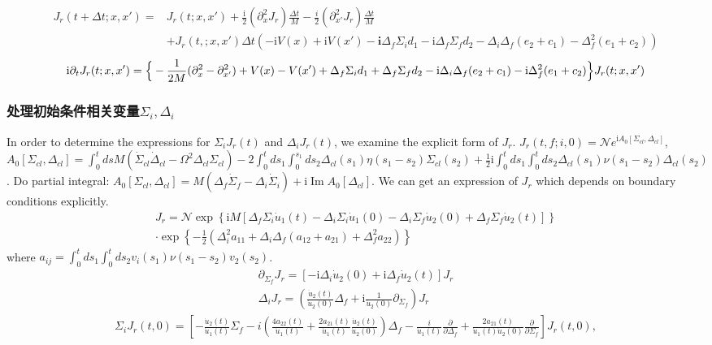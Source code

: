 \documentclass{article}
\renewcommand{\exp}[1]{\operatorname{exp}\left\{#1\right\}}
\begin{document}
    \begin{align*}
        J_r(t+\Delta t;x,x')=&J_r(t;x,x')+\frac{\mathrm{i}}{2}(\partial_x^2J_r)\frac{\Delta t}{M}-\frac{i}{2}(\partial_{x'}^2J_r)\frac{\Delta t}{M}\\
        &+J_r(t,;x,x')\Delta t\left(-\mathrm{i}V(x)+\mathrm{i}V(x')-\mathbf{i}\Delta_f\Sigma_id_1-\mathrm{i}\Delta_f\Sigma_f d_2-\Delta_i\Delta_f(e_2+c_1)-\Delta_f^2(e_1+c_2)\right)
    \end{align*}
    \begin{align}
        \mathrm{i}\partial_t J_r(t;x,x')=\Big{\{ }-\frac{1}{2M}(\partial_x^2-\partial_{x'}^2)+V(x)-V(x')+\Delta_f\Sigma_i d_1+\Delta_f\Sigma_fd_2-\mathrm{i}\Delta_i\Delta_f(e_2+c_1)-\mathrm{i}\Delta_f^2(e_1+c_2)\Big\}J_r(t;x,x')\label{eq:master1}
    \end{align}
\subsubsection{处理初始条件相关变量$\Sigma_i,\Delta_i$}
In order to determine the expressions for $\Sigma_i J_r(t)$ and $\Delta_i J_r(t)$, we examine the explicit form of $J_r$.
$J_r(t,f;i,0)=\mathcal{N}e^{\mathrm{i}A_0[\Sigma_{cl},\Delta_{cl}]}$,$A_0[\Sigma_{cl},\Delta_{cl}]=\int_0^t ds M(\dot{\Sigma}_{cl}\dot{\Delta}_{cl}-\Omega^2\Delta_{cl}\Sigma_{cl})-2\int_0^tds_1\int_0^{s_1}ds_2\Delta_{cl}(s_1)\eta(s_1-s_2)\Sigma_{cl}(s_2)+\frac{1}{2}\mathrm{i}\int_0^tds_1\int_0^{t}ds_2\Delta_{cl}(s_1)\nu(s_1-s_2)\Delta_{cl}(s_2)$. Do partial integral: $A_0[\Sigma_{cl},\Delta_{cl}]=M(\Delta_f\dot{\Sigma}_f-\Delta_i\dot{\Sigma}_i)+\mathrm{i}\operatorname{Im}A_0[\Delta_{cl}]$. We can get an expression of $J_r$ which depends on boundary conditions explicitly.
    \begin{align*}
    J_r=\mathcal{N}\exp{\mathrm{i}M\left[\Delta_f\Sigma_i\dot{u}_1(t)-\Delta_i\Sigma_i\dot{u}_1(0)-\Delta_i\Sigma_f\dot{u}_2(0)+\Delta_f\Sigma_f\dot{u}_2(t)\right]}\\
    \cdot \exp{-\frac{1}{2}(\Delta_i^2 a_{11}+\Delta_i\Delta_f(a_{12}+a_{21})+\Delta_f^2 a_{22})}
\end{align*}
where $a_{ij}=\int_{0}^tds_1\int_0^t ds_2 v_i(s_1)\nu(s_1-s_2)v_2(s_2)$.
\begin{align*}
    \partial_{\Sigma_f}J_r=[-\mathrm{i}\Delta_i\dot{u}_2(0)+\mathrm{i}\Delta_f\dot{u}_2(t)]J_r\\
    \Delta_iJ_r=(\frac{\dot{u}_2(t)}{\dot{u}_2(0)}\Delta_f+\mathrm{i}\frac{1}{\dot{u}_2(0)}\partial_{\Sigma_f})J_r
\end{align*}
\begin{align*}
    \Sigma_i J_r(t, 0) = \left[ -\frac{\dot{u}_2(t)}{\dot{u}_1(t)} \Sigma_f - i \left( \frac{4a_{22}(t)}{\dot{u}_1(t)} + \frac{2a_{21}(t)}{\dot{u}_1(t)} \frac{\dot{u}_2(t)}{\dot{u}_2(0)} \right) \Delta_f - \frac{i}{\dot{u}_1(t)} \frac{\partial}{\partial \Delta_f} + \frac{2a_{21}(t)}{\dot{u}_1(t) \dot{u}_2(0)} \frac{\partial}{\partial \Sigma_f} \right] J_r(t, 0),
\end{align*}
\end{document}
